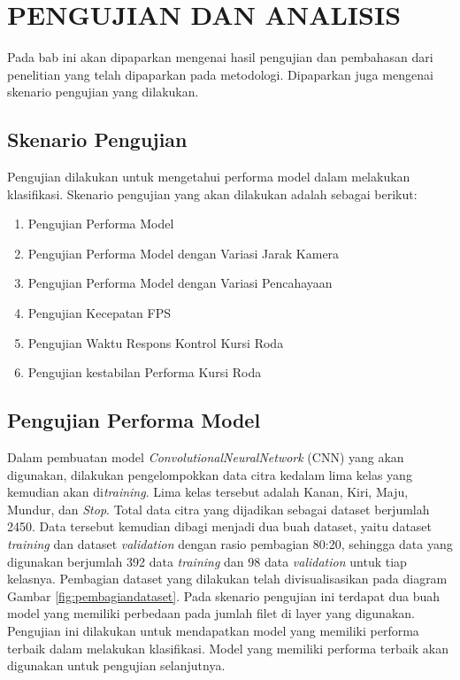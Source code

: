 \chapter{PENGUJIAN DAN ANALISIS}
\label{chap:pengujiananalisis}


Pada bab ini akan dipaparkan mengenai hasil pengujian dan pembahasan dari penelitian yang telah dipaparkan pada metodologi. Dipaparkan juga mengenai skenario pengujian yang dilakukan. 

\section{Skenario Pengujian}
Pengujian dilakukan untuk mengetahui performa model dalam melakukan klasifikasi. Skenario pengujian yang akan dilakukan adalah sebagai berikut:
\begin{enumerate}
    \item Pengujian Performa Model %
    \item Pengujian Performa Model dengan Variasi Jarak Kamera
    \item Pengujian Performa Model dengan Variasi Pencahayaan
    \item Pengujian Kecepatan FPS 
    \item Pengujian Waktu Respons Kontrol Kursi Roda
    \item Pengujian kestabilan Performa Kursi Roda 
\end{enumerate}

\section{Pengujian Performa Model}

Dalam pembuatan model \emph{ConvolutionalNeuralNetwork} (CNN) yang akan digunakan, dilakukan pengelompokkan data citra kedalam lima kelas yang kemudian akan di\emph{training}. Lima kelas tersebut adalah Kanan, Kiri, Maju, Mundur, dan \emph{Stop}. Total data citra yang dijadikan sebagai dataset berjumlah 2450. Data tersebut kemudian dibagi menjadi dua buah dataset, yaitu dataset \emph{training} dan dataset \emph{validation} dengan rasio pembagian 80:20, sehingga data yang digunakan berjumlah 392 data \emph{training} dan 98 data \emph{validation} untuk tiap kelasnya. Pembagian dataset yang dilakukan telah divisualisasikan pada diagram Gambar \ref{fig:pembagiandataset}. Pada skenario pengujian ini terdapat dua buah model yang memiliki perbedaan pada jumlah filet di layer yang digunakan. Pengujian ini dilakukan untuk mendapatkan model yang memiliki performa terbaik dalam melakukan klasifikasi. Model yang memiliki performa terbaik akan digunakan untuk pengujian selanjutnya.

